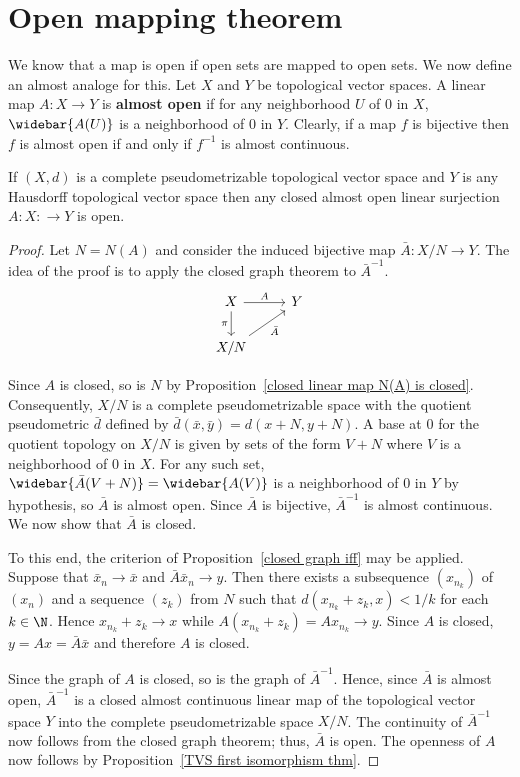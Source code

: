\section{Open mapping theorem}
We know that a map is open if open sets are mapped to open sets. We now define an almost analoge for this. Let $X$ and $Y$ be topological vector spaces. A linear map $A:X\to Y$ is \textbf{almost open} if for any neighborhood $U$ of $0$ in $X$, $\widebar{A(U)}$ is a neighborhood of $0$ in $Y$. Clearly, if a map $f$ is bijective then $f$ is almost open if and only if $f^{-1}$ is almost continuous.
\begin{theorem}\label{open mapping theorem}
If $(X,d)$ is a complete pseudometrizable topological vector space and $Y$ is any Hausdorff topological vector space then any closed almost open linear surjection $A:X:\to Y$ is open.
\end{theorem}
\begin{proof}
Let $N=N(A)$ and consider the induced bijective map $\bar{A}:X/N\to Y$. The idea of the proof is to apply the closed graph theorem to $\bar{A}^{-1}$.
\[\begin{tikzcd}
X\ar[d,swap,"\pi"]\ar[r,"A"]&Y\\
X/N\ar[ru,swap,"\bar{A}"]
\end{tikzcd}\]

Since $A$ is closed, so is $N$ by Proposition~\ref{closed linear map N(A) is closed}. Consequently, $X/N$ is a complete pseudometrizable space with the quotient pseudometric $\bar{d}$ defined by $\bar{d}(\bar{x},\bar{y})=d(x+N,y+N)$. A base at $0$ for the quotient topology on $X/N$ is given by sets of the form $V+N$ where $V$ is a neighborhood of $0$ in $X$. For any such set, $\widebar{\bar{A}(V+N)}=\widebar{A(V)}$ is a neighborhood of $0$ in $Y$ by hypothesis, so $\bar{A}$ is almost open. Since $\bar{A}$ is bijective, $\bar{A}^{-1}$ is almost continuous. We now show that $\bar{A}$ is closed.\par
To this end, the criterion of Proposition~\ref{closed graph iff} may be applied. Suppose that $\bar{x}_n\to\bar{x}$ and $\bar{A}\bar{x}_n\to y$. Then there exists a subsequence $(x_{n_k})$ of $(x_n)$ and a sequence $(z_k)$ from $N$ such that $d(x_{n_k}+z_k,x)<1/k$ for each $k\in\N$. Hence $x_{n_k}+z_k\to x$ while $A(x_{n_k}+z_k)=Ax_{n_k}\to y$. Since $A$ is closed, $y=Ax=\bar{A}\bar{x}$ and therefore $A$ is closed.\par
Since the graph of $A$ is closed, so is the graph of $\bar{A}^{-1}$. Hence, since $\bar{A}$ is almost open, $\bar{A}^{-1}$ is a closed almost continuous linear map of the topological vector space $Y$ into the complete pseudometrizable space $X/N$. The continuity of $\bar{A}^{-1}$ now follows from the closed graph theorem; thus, $\bar{A}$ is open. The openness of $A$ now follows by Proposition~\ref{TVS first isomorphism thm}.
\end{proof}

